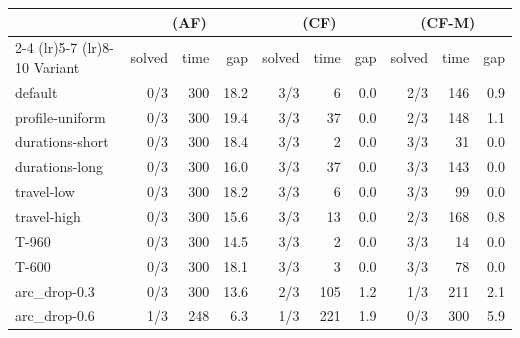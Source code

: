 \begin{tabular}{lrrrrrrrrr}
\toprule
 & \multicolumn{3}{c}{(AF)} & \multicolumn{3}{c}{(CF)} & \multicolumn{3}{c}{(CF-M)} \\
\cmidrule(lr){2-4} \cmidrule(lr){5-7} \cmidrule(lr){8-10}
Variant & solved & time & gap & solved & time & gap & solved & time & gap \\
\midrule
default & 0/3 & 300 & 18.2 & 3/3 & 6 & 0.0 & 2/3 & 146 & 0.9 \\
profile-uniform & 0/3 & 300 & 19.4 & 3/3 & 37 & 0.0 & 2/3 & 148 & 1.1 \\
durations-short & 0/3 & 300 & 18.4 & 3/3 & 2 & 0.0 & 3/3 & 31 & 0.0 \\
durations-long & 0/3 & 300 & 16.0 & 3/3 & 37 & 0.0 & 3/3 & 143 & 0.0 \\
travel-low & 0/3 & 300 & 18.2 & 3/3 & 6 & 0.0 & 3/3 & 99 & 0.0 \\
travel-high & 0/3 & 300 & 15.6 & 3/3 & 13 & 0.0 & 2/3 & 168 & 0.8 \\
T-960 & 0/3 & 300 & 14.5 & 3/3 & 2 & 0.0 & 3/3 & 14 & 0.0 \\
T-600 & 0/3 & 300 & 18.1 & 3/3 & 3 & 0.0 & 3/3 & 78 & 0.0 \\
arc\_drop-0.3 & 0/3 & 300 & 13.6 & 2/3 & 105 & 1.2 & 1/3 & 211 & 2.1 \\
arc\_drop-0.6 & 1/3 & 248 & 6.3 & 1/3 & 221 & 1.9 & 0/3 & 300 & 5.9 \\
\bottomrule
\end{tabular}

